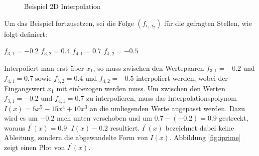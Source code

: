 \documentclass[11pt,a4paper]{article}
\begin{document}
\begin{center}
\begin{figure}[!ht]
\centering
{}
\caption[Beispiel 2D Interpolation]{Beispiel 2D Interpolation}
\end{figure}
\end{center}
\noindent
Um das Beispiel fortzusetzen, sei die Folge $(f_{i_1, i_2})$ für die gefragten Stellen, wie folgt definiert:
\begin{center}
$f_{3, 1} = -0.2$ \hspace{10pt} $f_{3, 2} = 0.4$ \hspace{10pt} $f_{4, 1} = 0.7$ \hspace{10pt} $f_{4, 2} = -0.5$\\
\end{center}
\noindent
Interpoliert man erst über $x_1$, so muss zwischen den Wertepaaren $f_{3, 1} = -0.2$ und $f_{4, 1} = 0.7$ sowie $f_{3, 2} = 0.4$ und $f_{4, 2} = -0.5$ interpoliert werden, wobei der Eingangswert $x_1$ mit einbezogen werden muss. Um zwischen den Werten $f_{3, 1} = -0.2$ und $f_{4, 1} = 0.7$ zu interpolieren, muss das Interpolationspolynom $I(x) = 6x^5-15x^4+10x^3$ an die umliegenden Werte angepasst werden. Dazu wird es um $-0.2$ nach unten verschoben und um $0.7 - (-0.2) = 0.9$ gestreckt, woraus $I^\prime(x) = 0.9 \cdot I(x) - 0.2$ resultiert. $I^\prime(x)$ bezeichnet dabei keine Ableitung, sondern die abgewandelte Form von $I(x)$. Abbildung \ref{fig:iprime} zeigt einen Plot von $I^\prime(x)$.
\end{document}
